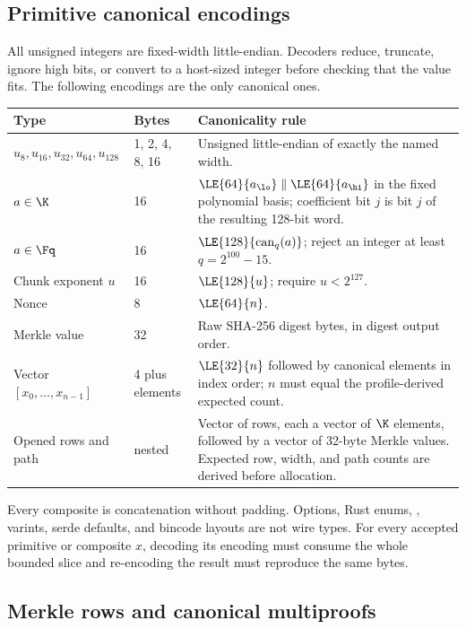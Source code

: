 \subsection{Primitive canonical encodings}
\label{sec:wire-primitives}

All unsigned integers are fixed-width little-endian.  Decoders \mustnot{}
reduce, truncate, ignore high bits, or convert to a host-sized integer before
checking that the value fits.  The following encodings are the only canonical
ones.

\begingroup\footnotesize
\renewcommand{\arraystretch}{1.05}
\begin{tabularx}{\linewidth}{@{}p{1.25in}p{1.35in}X@{}}
\toprule
\textbf{Type}&\textbf{Bytes}&\textbf{Canonicality rule}\\
\midrule
$u_8,u_{16},u_{32},u_{64},u_{128}$&1, 2, 4, 8, 16&Unsigned
little-endian of exactly the named width.\\
$a\in\K$&16&$\LE{64}{a_{\lo}}\parallel\LE{64}{a_{\hi}}$ in the fixed
polynomial basis; coefficient bit $j$ is bit $j$ of the resulting 128-bit
word.\\
$a\in\Fq$&16&$\LE{128}{\operatorname{can}_q(a)}$; reject an integer at least
$q=2^{100}-15$.\\
Chunk exponent $u$&16&$\LE{128}{u}$; require $u<2^{127}$.\\
Nonce&8&$\LE{64}{n}$.\\
Merkle value&32&Raw SHA-256 digest bytes, in digest output order.\\
Vector $[x_0,\ldots,x_{n-1}]$&4 plus elements&$\LE{32}{n}$ followed by
canonical elements in index order; $n$ must equal the profile-derived expected
count.\\
Opened rows and path&nested&Vector of rows, each a vector of $\K$ elements,
followed by a vector of 32-byte Merkle values.  Expected row, width, and path
counts are derived before allocation.\\
\bottomrule
\end{tabularx}
\endgroup

Every composite is concatenation without padding.  Options, Rust enums,
, varints, serde defaults, and bincode layouts are not wire types.
For every accepted primitive or composite $x$, decoding its encoding must
consume the whole bounded slice and re-encoding the result must reproduce the
same bytes.

\subsection{Merkle rows and canonical multiproofs}
\label{sec:wire-merkle}

